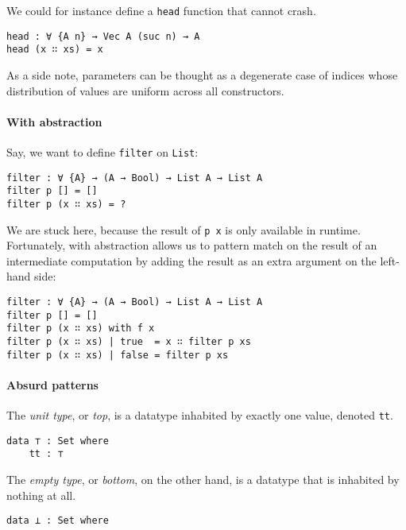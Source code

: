 \documentclass[12pt, a4paper]{article}
\begin{document}
We could for instance define a {\lstinline|head|} function that cannot crash.

\begin{lstlisting}
head : ∀ {A n} → Vec A (suc n) → A
head (x ∷ xs) = x
\end{lstlisting}

As a side note, parameters can be thought as a degenerate case of indices whose
distribution of values are uniform across all constructors.

\paragraph{With abstraction}

Say, we want to define {\lstinline|filter|} on {\lstinline|List|}:

\begin{lstlisting}
filter : ∀ {A} → (A → Bool) → List A → List A
filter p [] = []
filter p (x ∷ xs) = ?
\end{lstlisting}

We are stuck here, because the result of {\lstinline|p x|} is only available in
runtime. Fortunately, with abstraction allows us to pattern match on the result
of an intermediate computation by adding the result as an extra argument on the
left-hand side:

\begin{lstlisting}
filter : ∀ {A} → (A → Bool) → List A → List A
filter p [] = []
filter p (x ∷ xs) with f x
filter p (x ∷ xs) | true  = x ∷ filter p xs
filter p (x ∷ xs) | false = filter p xs
\end{lstlisting}

\paragraph{Absurd patterns}

The \textit{unit type}, or \textit{top}, is a datatype inhabited by
exactly one value, denoted {\lstinline|tt|}.

\begin{lstlisting}
data ⊤ : Set where
    tt : ⊤
\end{lstlisting}

The \textit{empty type}, or \textit{bottom}, on the other hand, is a datatype
that is inhabited by nothing at all.

\begin{lstlisting}
data ⊥ : Set where
\end{lstlisting}
\end{document}
